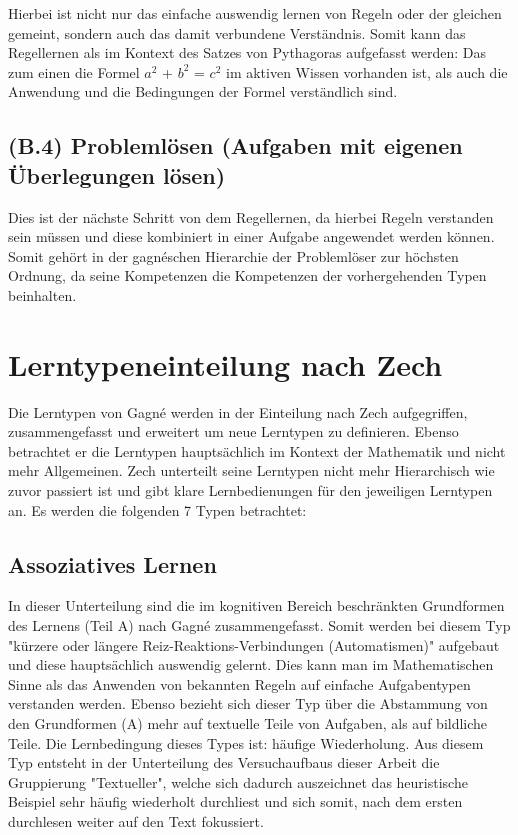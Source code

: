 Hierbei ist nicht nur das einfache auswendig lernen von Regeln oder der gleichen gemeint, sondern auch das damit verbundene Verständnis. Somit kann das Regellernen als im Kontext des Satzes von Pythagoras aufgefasst werden: Das zum einen die Formel $a^2$ + $b^2$ = $c^2$ im aktiven Wissen vorhanden ist, als auch die Anwendung und die Bedingungen der Formel verständlich sind.

\subsection[]{(B.4) Problemlösen (Aufgaben mit eigenen Überlegungen lösen)}

Dies ist der nächste Schritt von dem Regellernen, da hierbei Regeln verstanden sein müssen und diese kombiniert in einer Aufgabe angewendet werden können. Somit gehört in der gagnéschen Hierarchie der Problemlöser zur höchsten Ordnung, da seine Kompetenzen die Kompetenzen der vorhergehenden Typen beinhalten.

\section{Lerntypeneinteilung nach Zech}

Die Lerntypen von Gagné werden in der Einteilung nach Zech aufgegriffen, zusammengefasst und erweitert um neue Lerntypen zu definieren. Ebenso betrachtet er die Lerntypen hauptsächlich im Kontext der Mathematik und nicht mehr Allgemeinen. Zech unterteilt seine Lerntypen nicht mehr Hierarchisch wie zuvor passiert ist und gibt klare Lernbedienungen für den jeweiligen Lerntypen an. Es werden die folgenden 7 Typen betrachtet:

\subsection[]{Assoziatives Lernen}

In dieser Unterteilung sind die im kognitiven Bereich beschränkten Grundformen des Lernens (Teil A) nach Gagné zusammengefasst. Somit werden bei diesem Typ "kürzere oder längere Reiz-Reaktions-Verbindungen (Automatismen)" aufgebaut und diese hauptsächlich auswendig gelernt. Dies kann man im Mathematischen Sinne als das Anwenden von bekannten Regeln auf einfache Aufgabentypen verstanden werden. Ebenso bezieht sich dieser Typ über die Abstammung von den Grundformen (A) mehr auf textuelle Teile von Aufgaben, als auf bildliche Teile.
Die Lernbedingung dieses Types ist: häufige Wiederholung. 
Aus diesem Typ entsteht in der Unterteilung des Versuchaufbaus dieser Arbeit die Gruppierung "Textueller", welche sich dadurch auszeichnet das heuristische Beispiel sehr häufig wiederholt durchliest und sich somit, nach dem ersten durchlesen weiter auf den Text fokussiert. 


